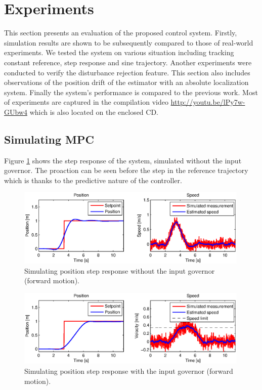 \section{Experiments}

This section presents an evaluation of the proposed control system. Firstly, simulation results are shown to be subsequently compared to those of real-world experiments. We tested the system on various situation including tracking constant reference, step response and sine trajectory. Another experiments were conducted to verify the disturbance rejection feature. This section also includes observations of the position drift of the estimator with an absolute localization system. Finally the system's performance is compared to the previous work. Most of experiments are captured in the compilation video \url{http://youtu.be/lPy7w-GUbw4} which is also located on the enclosed CD. 

\subsection{Simulating MPC}

Figure \ref{fig:simulation_step_no_governor} shows the step response of the system, simulated without the input governor. The proaction can be seen before the step in the reference trajectory which is thanks to the predictive nature of the controller. 

\begin{figure}[H]
\centering
\includegraphics[width=0.99\textwidth]{fig/simulation1_step_no_governor.eps}
\caption{Simulating position step response without the input governor (forward motion).}
\label{fig:simulation_step_no_governor}
\end{figure}

\begin{figure}[H]
\centering
\includegraphics[width=0.99\textwidth]{fig/simulation2_step_governor.eps}
\caption{Simulating position step response with the input governor (forward motion).}
\label{fig:simulation_step_governor}
\end{figure}

